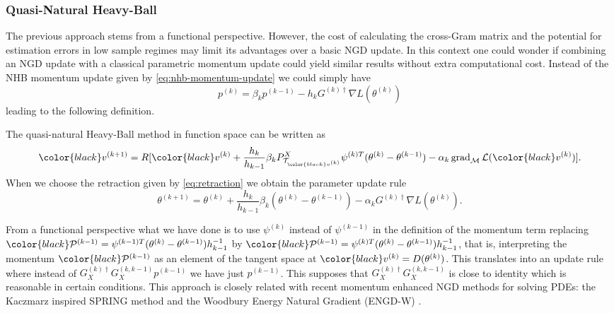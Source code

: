 \documentclass{article}
\theoremstyle{noparens}
\newcommand{\cL}{\mathcal{L}}
\newcommand{\cT}{\mathcal{T}}
\newcommand{\cM}{\mathcal{M}}
\newcommand{\cP}{\mathcal{P}}
\newcommand{\colorM}{\color{black}}
\newcommand{\colorT}{\color{black}}
\newcommand{\paramk}{\theta^{(k)}}
\newcommand{\paramkm}{\theta^{(k-1)}}
\newcommand{\paramkp}{\theta^{(k+1)}}
\newcommand{\vk}{{\colorM v^{(k)}}}
\newcommand{\vkp}{{\colorM v^{(k+1)}}}
\newcommand{\psik}{\psi^{(k)}}
\newcommand{\psikm}{\psi^{(k-1)}}
\newcommand{\psikT}{\psi^{(k)T}}
\newcommand{\psikmT}{\psi^{(k-1)T}}
\newcommand{\pk}{p^{(k)}}
\newcommand{\pkm}{p^{(k-1)}}
\newcommand{\Pkm}{{\colorT \cP^{(k-1)}}}
\newcommand{\Ginvk}{{G^{(k)\dagger}}}
\newcommand{\GXinvk}{{G^{(k)\dagger}_X}}
\newcommand{\GXkkm}{{G^{(k,k-1)}_X}}
\newcommand{\GradP}{\nabla}
\newcommand{\LossGrad}{\GradP L}
\newcommand{\gradM}{\operatorname{grad}_{\cM}}
\begin{document}
\subsubsection{Quasi-Natural Heavy-Ball}
\label{sec:qnhb}

The previous approach stems from a functional perspective. However, the cost of calculating the cross-Gram matrix and the potential for estimation errors in low sample regimes may limit its advantages over a basic NGD update. In this context one could wonder if combining an NGD update with a classical parametric momentum update could  yield similar results without extra computational cost. Instead of the NHB momentum update given by \eqref{eq:nhb-momentum-update} we could simply have
\begin{equation}
    \pk = \beta_k \pkm - h_k \Ginvk\nabla L(\paramk) \label{eq:qnhb-momentum-update}
\end{equation}
leading to the following definition.
\begin{definition}
The quasi-natural Heavy-Ball method in function space can be written as
\begin{align*}
    \vkp = R[\vk + \frac{h_k }{h_{k-1}}\beta_k P^X_{\cT_{\vk}} \psikT (\paramk-\paramkm)  - \alpha_k \gradM \cL(\vk)].
\end{align*}
When we choose the retraction given by \eqref{eq:retraction} we obtain the parameter update rule
\begin{equation}
    \paramkp
= \paramk + \frac{h_k}{h_{k-1}}\beta_k(\paramk - \paramkm) - \alpha_k\Ginvk\LossGrad(\paramk).
\end{equation}
\end{definition}
From a functional perspective what we have done is to use $\psik$ instead of $\psikm$ in the definition of the momentum term replacing $\Pkm = \psikmT (\paramk-\paramkm) h_{k-1}^{-1}$ by $\Pkm = \psikT (\paramk-\paramkm)h_{k-1}^{-1}$, that is, interpreting the momentum $\Pkm $ as an element of the tangent space at $\vk = D(\paramk)$. This translates into an update rule where instead of $\GXinvk\GXkkm\pkm$ we have just $\pkm$. This supposes that $\GXinvk\GXkkm$ is close to identity which is reasonable in certain conditions.
This approach is closely related with recent momentum enhanced NGD methods for solving PDEs: the Kaczmarz inspired SPRING method \cite{Kaczmarz2024} and the Woodbury Energy Natural Gradient (ENGD-W) \cite{ImprovingEnergyNatural2025}.
\end{document}
